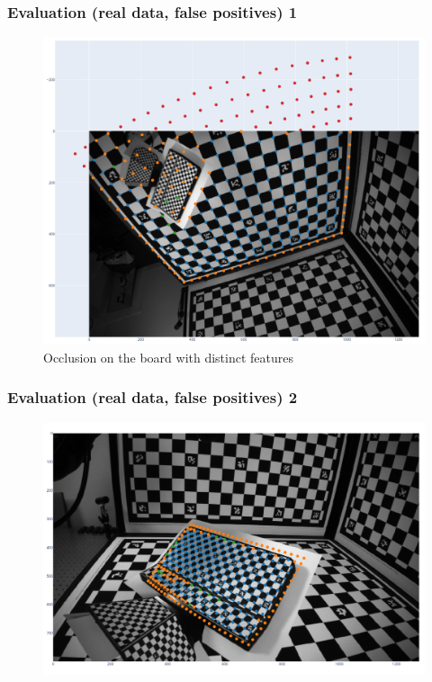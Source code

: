 \documentclass{beamer}
\begin{document}
\begin{frame}
	\frametitle{Evaluation (real data, false positives) 1}

	\begin{figure}
		\includegraphics[width=0.8\linewidth]{refined_corners_bad.png}
		\caption{Occlusion on the board with distinct features}
	\end{figure}

\end{frame}

\begin{frame}
	\frametitle{Evaluation (real data, false positives) 2}
	\begin{figure}
		\includegraphics[width=\linewidth]{refined_corners_bad_bad.png}
	\end{figure}

\end{frame}
\end{document}
